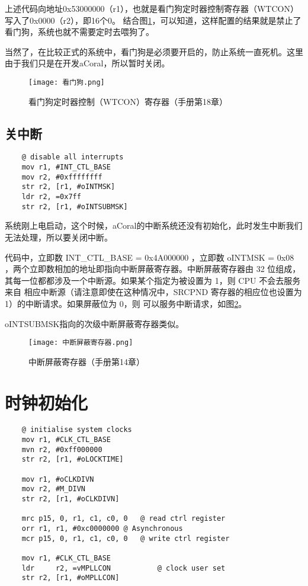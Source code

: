 上述代码向地址0x53000000（r1），也就是看门狗定时器控制寄存器（WTCON）写入了0x0000（r2），即16个0。
结合图\ref{看门狗}，可以知道，这样配置的结果就是禁止了看门狗，系统也就不需要定时去喂狗了。

当然了，在比较正式的系统中，看门狗是必须要开启的，防止系统一直死机。这里由于我们只是在开发aCoral，所以暂时关闭。


\begin{figure}[H]
	\texttt{[image: 看门狗.png]}
	\caption{看门狗定时器控制（WTCON）寄存器（手册第18章）}
	\label{看门狗}
\end{figure}
\subsection{关中断}
\begin{lstlisting}
	@ disable all interrupts
	mov	r1, #INT_CTL_BASE
	mov	r2, #0xffffffff
	str	r2, [r1, #oINTMSK]
	ldr	r2, =0x7ff
	str	r2, [r1, #oINTSUBMSK]
\end{lstlisting}

系统刚上电启动，这个时候，aCoral的中断系统还没有初始化，此时发生中断我们无法处理，所以要关闭中断。

代码中，立即数 INT\_CTL\_BASE = 0x4A000000 ，立即数 oINTMSK = 0x08 ，两个立即数相加的地址即指向中断屏蔽寄存器。中断屏蔽寄存器由 32 位组成，其每一位都都涉及一个中断源。如果某个指定为被设置为 1，则 CPU 不会去服务来自
相应中断源（请注意即使在这种情况中，SRCPND 寄存器的相应位也设置为 1）的中断请求。如果屏蔽位为 0，则
可以服务中断请求，如图\ref{中断屏蔽寄存器}。

oINTSUBMSK指向的次级中断屏蔽寄存器类似。

\begin{figure}[H]
	\texttt{[image: 中断屏蔽寄存器.png]}
	\caption{中断屏蔽寄存器（手册第14章）}
	\label{中断屏蔽寄存器}
\end{figure}


\section{时钟初始化}
\begin{lstlisting}
	@ initialise system clocks
	mov	r1, #CLK_CTL_BASE
	mvn	r2, #0xff000000
	str	r2, [r1, #oLOCKTIME]

	mov	r1, #oCLKDIVN
	mov	r2, #M_DIVN
	str	r2, [r1, #oCLKDIVN]

	mrc	p15, 0, r1, c1, c0, 0	@ read ctrl register
	orr	r1, r1, #0xc0000000	@ Asynchronous
	mcr	p15, 0, r1, c1, c0, 0	@ write ctrl register

	mov	r1, #CLK_CTL_BASE
	ldr 	r2, =vMPLLCON	        @ clock user set
	str	r2, [r1, #oMPLLCON]
\end{lstlisting}

